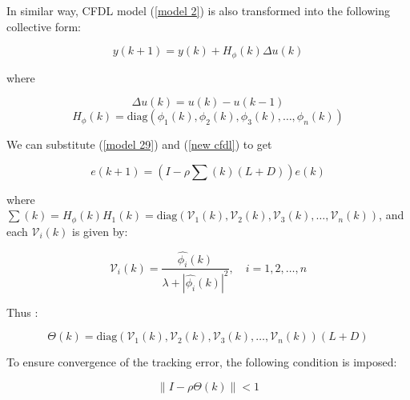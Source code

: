 \documentclass[journal,onecolumn]{IEEEtran}
\begin{document}
In similar way, CFDL model (\ref{model 2}) is also transformed into the following collective form:

\begin{equation}
    \label{new cfdl}
    y(k+1) = y(k) + H_\phi(k) \Delta u(k)
\end{equation}

where

\[\Delta u(k) = u(k)-u(k-1)\]
\[
H_\phi(k) = \text{diag}(\phi_1(k), \phi_2(k), \phi_3(k), \dots, \phi_n(k))
\]


We can substitute (\ref{model 29}) and (\ref{new cfdl}) to get

\begin{equation}
    \label{model 30}
    e(k+1) = (I - \rho \sum(k) (L+D)) e(k)
\end{equation}

where $\sum(k) = H_\phi(k)H_1(k) = \text{diag}(\mathcal{V}_1(k), \mathcal{V}_2(k), \mathcal{V}_3(k), \dots, \mathcal{V}_n(k))$, and each \(\mathcal{V}_i(k)\) is given by:









\[
\mathcal{V}_i(k) = \frac{\hat{\phi_i}(k)}{\lambda + |\hat{\phi_i}(k)|^2}, \quad i = 1, 2, \dots, n
\]

Thus :

\[
\Theta(k) = \text{diag}(\mathcal{V}_1(k), \mathcal{V}_2(k), \mathcal{V}_3(k), \dots, \mathcal{V}_n(k)) (L + D)
\]

To ensure convergence of the tracking error, the following condition is imposed:

\begin{equation}
    \label{model 31}
    \|I - \rho \Theta(k)\| < 1
\end{equation}
\end{document}
